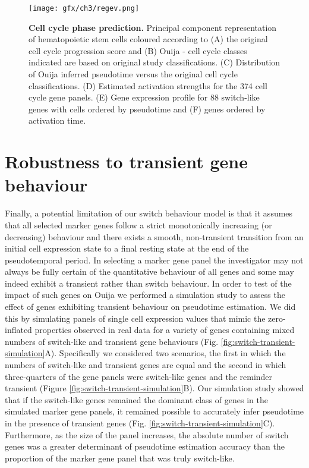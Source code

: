 \begin{figure}
	\texttt{[image: gfx/ch3/regev.png]}
	\caption{{\bf Cell cycle phase prediction.} Principal component representation of hematopoietic stem cells coloured according to (A) the original cell cycle progression score \cite{kowalczyk2015single} and (B) Ouija - cell cycle classes indicated are based on original study classifications. (C) Distribution of Ouija inferred pseudotime versus the original cell cycle classifications. (D) Estimated activation strengths for the 374 cell cycle gene panels. (E) Gene expression profile for 88 switch-like genes with cells ordered by pseudotime and (F) genes ordered by activation time.}
	\label{fig:regev}
\end{figure}


\section{Robustness to transient gene behaviour}

Finally, a potential limitation of our switch behaviour model is that it assumes that all selected marker genes follow a strict monotonically increasing (or decreasing) behaviour and there exists a smooth, non-transient transition from an initial cell expression state to a final resting state at the end of the pseudotemporal period. In selecting a marker gene panel the investigator may not always be fully certain of the quantitative behaviour of all genes and some may indeed exhibit a transient rather than switch behaviour. In order to test of the impact of such genes on Ouija we performed a simulation study to assess the effect of genes exhibiting transient behaviour on pseudotime estimation. We did this by simulating panels of single cell expression values that mimic the zero-inflated properties observed in real data for a variety of genes containing mixed numbers of switch-like and transient gene behaviours (Fig. \ref{fig:switch-transient-simulation}A). Specifically we considered two scenarios, the first in which the numbers of switch-like and transient genes are equal and the second in which three-quarters of the gene panels were switch-like genes and the reminder transient (Figure \ref{fig:switch-transient-simulation}B). Our simulation study showed that if the switch-like genes remained the dominant class of genes in the simulated marker gene panels, it remained possible to accurately infer pseudotime in the presence of transient genes (Fig. \ref{fig:switch-transient-simulation}C). Furthermore, as the size of the panel increases, the absolute number of switch genes was a greater determinant of pseudotime estimation accuracy than the proportion of the marker gene panel that was truly switch-like.

